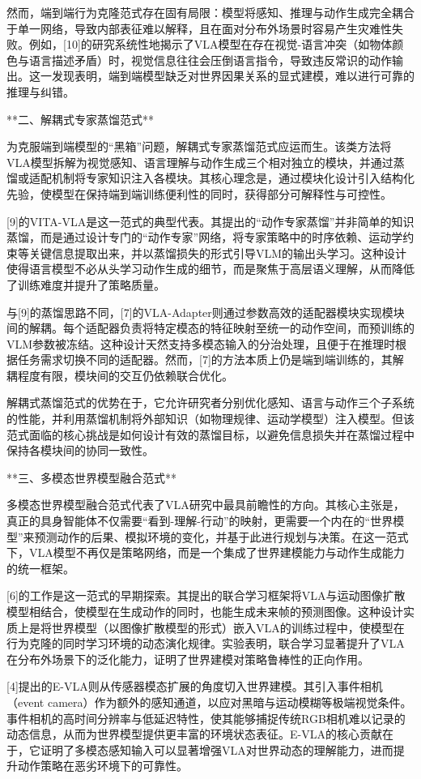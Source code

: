 \documentclass{article}
\begin{document}
然而，端到端行为克隆范式存在固有局限：模型将感知、推理与动作生成完全耦合于单一网络，导致内部表征难以解释，且在面对分布外场景时容易产生灾难性失败。例如，[10]的研究系统性地揭示了VLA模型在存在视觉-语言冲突（如物体颜色与语言描述矛盾）时，视觉信息往往会压倒语言指令，导致违反常识的动作输出。这一发现表明，端到端模型缺乏对世界因果关系的显式建模，难以进行可靠的推理与纠错。

**二、解耦式专家蒸馏范式**

为克服端到端模型的“黑箱”问题，解耦式专家蒸馏范式应运而生。该类方法将VLA模型拆解为视觉感知、语言理解与动作生成三个相对独立的模块，并通过蒸馏或适配机制将专家知识注入各模块。其核心理念是，通过模块化设计引入结构化先验，使模型在保持端到端训练便利性的同时，获得部分可解释性与可控性。

[9]的VITA-VLA是这一范式的典型代表。其提出的“动作专家蒸馏”并非简单的知识蒸馏，而是通过设计专门的“动作专家”网络，将专家策略中的时序依赖、运动学约束等关键信息提取出来，并以蒸馏损失的形式引导VLM的输出头学习。这种设计使得语言模型不必从头学习动作生成的细节，而是聚焦于高层语义理解，从而降低了训练难度并提升了策略质量。

与[9]的蒸馏思路不同，[7]的VLA-Adapter则通过参数高效的适配器模块实现模块间的解耦。每个适配器负责将特定模态的特征映射至统一的动作空间，而预训练的VLM参数被冻结。这种设计天然支持多模态输入的分治处理，且便于在推理时根据任务需求切换不同的适配器。然而，[7]的方法本质上仍是端到端训练的，其解耦程度有限，模块间的交互仍依赖联合优化。

解耦式蒸馏范式的优势在于，它允许研究者分别优化感知、语言与动作三个子系统的性能，并利用蒸馏机制将外部知识（如物理规律、运动学模型）注入模型。但该范式面临的核心挑战是如何设计有效的蒸馏目标，以避免信息损失并在蒸馏过程中保持各模块间的协同一致性。

**三、多模态世界模型融合范式**

多模态世界模型融合范式代表了VLA研究中最具前瞻性的方向。其核心主张是，真正的具身智能体不仅需要“看到-理解-行动”的映射，更需要一个内在的“世界模型”来预测动作的后果、模拟环境的变化，并基于此进行规划与决策。在这一范式下，VLA模型不再仅是策略网络，而是一个集成了世界建模能力与动作生成能力的统一框架。

[6]的工作是这一范式的早期探索。其提出的联合学习框架将VLA与运动图像扩散模型相结合，使模型在生成动作的同时，也能生成未来帧的预测图像。这种设计实质上是将世界模型（以图像扩散模型的形式）嵌入VLA的训练过程中，使模型在行为克隆的同时学习环境的动态演化规律。实验表明，联合学习显著提升了VLA在分布外场景下的泛化能力，证明了世界建模对策略鲁棒性的正向作用。

[4]提出的E-VLA则从传感器模态扩展的角度切入世界建模。其引入事件相机（event camera）作为额外的感知通道，以应对黑暗与运动模糊等极端视觉条件。事件相机的高时间分辨率与低延迟特性，使其能够捕捉传统RGB相机难以记录的动态信息，从而为世界模型提供更丰富的环境状态表征。E-VLA的核心贡献在于，它证明了多模态感知输入可以显著增强VLA对世界动态的理解能力，进而提升动作策略在恶劣环境下的可靠性。
\end{document}
